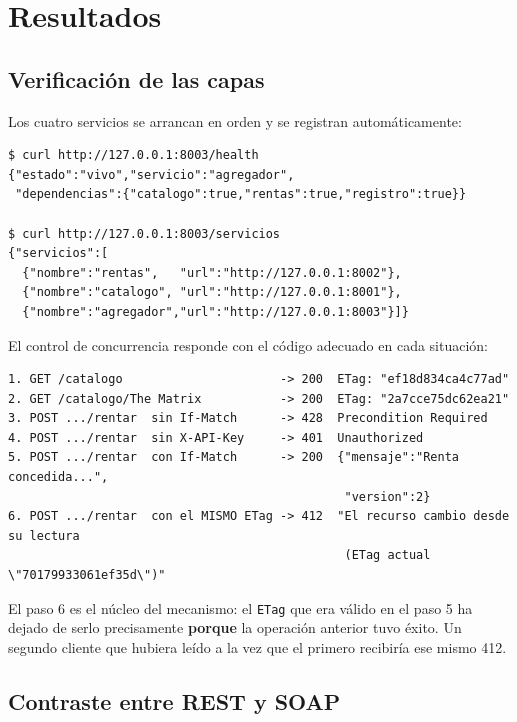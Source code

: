 \documentclass[12pt]{article}
\begin{document}
\section{Resultados}

\subsection{Verificación de las capas}

Los cuatro servicios se arrancan en orden y se registran automáticamente:

\begin{lstlisting}[style=traza,caption={Descubrimiento y salud compuesta}]
$ curl http://127.0.0.1:8003/health
{"estado":"vivo","servicio":"agregador",
 "dependencias":{"catalogo":true,"rentas":true,"registro":true}}

$ curl http://127.0.0.1:8003/servicios
{"servicios":[
  {"nombre":"rentas",   "url":"http://127.0.0.1:8002"},
  {"nombre":"catalogo", "url":"http://127.0.0.1:8001"},
  {"nombre":"agregador","url":"http://127.0.0.1:8003"}]}
\end{lstlisting}

El control de concurrencia responde con el código adecuado en cada situación:

\begin{lstlisting}[style=traza,caption={Secuencia completa de códigos de estado}]
1. GET /catalogo                      -> 200  ETag: "ef18d834ca4c77ad"
2. GET /catalogo/The Matrix           -> 200  ETag: "2a7cce75dc62ea21"
3. POST .../rentar  sin If-Match      -> 428  Precondition Required
4. POST .../rentar  sin X-API-Key     -> 401  Unauthorized
5. POST .../rentar  con If-Match      -> 200  {"mensaje":"Renta concedida...",
                                               "version":2}
6. POST .../rentar  con el MISMO ETag -> 412  "El recurso cambio desde su lectura
                                               (ETag actual \"70179933061ef35d\")"
\end{lstlisting}

El paso 6 es el núcleo del mecanismo: el \texttt{ETag} que era válido en el paso 5 ha dejado de serlo precisamente \textbf{porque} la operación anterior tuvo éxito. Un segundo cliente que hubiera leído a la vez que el primero recibiría ese mismo 412.

\subsection{Contraste entre REST y SOAP}
\end{document}
